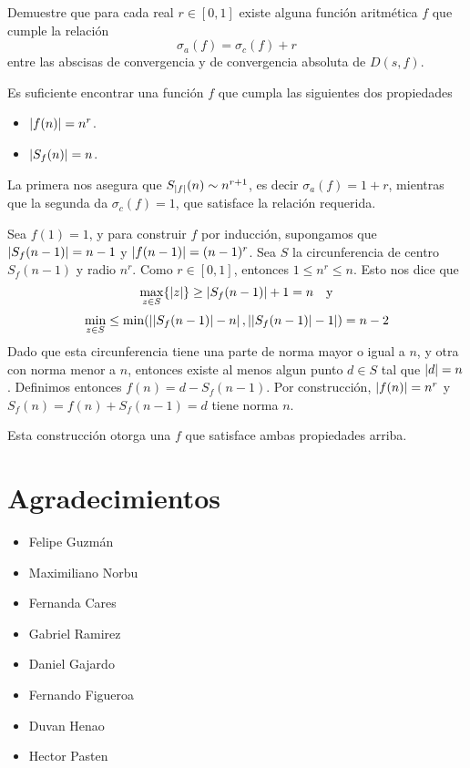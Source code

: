 \begin{prob}[3 pts.]
    Demuestre que para cada real $r\in[0,1]$ existe alguna función aritmética $f$ que cumple la relación
    \[\sigma_a(f)=\sigma_c(f)+r\]
    entre las abscisas de convergencia y de convergencia absoluta de $D(s,f)$.
\end{prob}

\begin{sol}
    Es suficiente encontrar una funci\'on $f$ que cumpla las siguientes dos propiedades
    \begin{itemize}
        \item $\left|f(n)\right| = n^r$.
        \item $\left|S_f(n)\right| = n$.
    \end{itemize}
    La primera nos asegura que $S_{\left|f\right|}(n) \sim n^{r+1}$, es decir $\sigma_a(f) = 1+r$, mientras que la segunda da $\sigma_c(f) = 1$, que satisface la relación requerida.

    Sea $f(1) = 1$, y para construir $f$ por inducci\'on, supongamos que $\left|S_f(n-1)\right| = n-1$ y $\left|f(n-1)\right| = (n-1)^r$. Sea $S$ la circunferencia de centro $S_f(n-1)$ y radio $n^r$. Como $r \in [0,1]$, entonces $1 \leq n^r \leq n$. Esto nos dice que
    $$\max_{z \in S}\{\left|z\right|\} \geq \left|S_f(n-1)\right| + 1 = n\quad \text{y}$$
    $$\min_{z \in S} \leq \min(\left|\left|S_f(n-1)\right| - n\right|,\left|\left|S_f(n-1)\right| - 1\right|) = n-2$$
    Dado que esta circunferencia tiene una parte de norma mayor o igual a $n$, y otra con norma menor a $n$, entonces existe al menos algun punto $d \in S$ tal que $\left|d\right| = n$. Definimos entonces $f(n) = d - S_f(n-1)$. Por construcci\'on, $\left|f(n)\right| = n^r$ y $S_f(n) = f(n) + S_f(n-1) = d$ tiene norma $n$.

    Esta construcción otorga una $f$ que satisface ambas propiedades arriba.
\end{sol}

\section{Agradecimientos}
\begin{multicols}{3}
    \begin{itemize}
        \item Felipe Guzmán

        \item Maximiliano Norbu

        \item Fernanda Cares

        \item Gabriel Ramirez

        \item Daniel Gajardo

        \item Fernando Figueroa

        \item Duvan Henao

        \item Hector Pasten
    \end{itemize}
\end{multicols}




